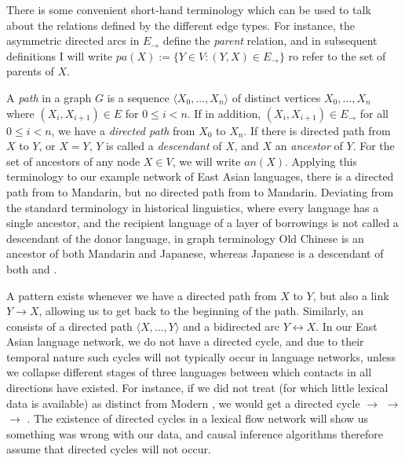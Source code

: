 There is some convenient short-hand terminology which can be used to talk about the relations defined by the different edge types. For instance, the asymmetric directed arcs in $E_\rightarrow$ define the \textit{parent} relation, and in subsequent definitions I will write $pa(X) := \{Y \in V\colon (Y,X) \in E_{\rightarrow}\}$ ro refer to the set of parents of $X$.

A \textit{path} in a graph $G$ is a sequence $\langle X_0,\dots,X_n \rangle$ of distinct vertices $X_0,\dots,X_n$ where $(X_i,X_{i+1}) \in E$ for $0 \leq i < n$. If in addition, $(X_i,X_{i+1}) \in E_\rightarrow$ for all $0 \leq i < n$, we have a \textit{directed path} from $X_0$ to $X_n$. If there is directed path from $X$ to $Y$, or $X = Y$, $Y$ is called a \textit{descendant} of $X$, and $X$ an \textit{ancestor} of $Y$. For the set of ancestors of any node $X \in V$, we will write $an(X)$. Applying this terminology to our example network of East Asian languages, there is a directed path from  to Mandarin, but no directed path from  to Mandarin. Deviating from the standard terminology in historical linguistics, where every language has a single ancestor, and the recipient language of a layer of borrowings is not called a descendant of the donor language, in 
graph terminology Old Chinese is an ancestor of both Mandarin and Japanese, whereas Japanese is a descendant of both  and .

\newpage 
A \textit{} pattern exists whenever we have a directed path from $X$ to $Y$, but also a link $Y \rightarrow X$, allowing us to get back to the beginning of the path. Similarly, an \textit{} consists of a directed path $\langle X,\dots,Y \rangle$ and a bidirected arc $Y \leftrightarrow X$. In our East Asian language network, we do not have a directed cycle, and due to their temporal nature such cycles will not typically occur in language networks, unless we collapse different stages of three languages between which contacts in all directions have existed. For instance, if we did not treat  (for which little lexical data is available) as distinct from Modern , we would get a directed cycle  $\rightarrow$  $\rightarrow$  $\rightarrow$ . The existence of directed cycles in a lexical flow network will show us something was wrong with our data, and causal inference algorithms therefore assume that directed cycles will not occur.

